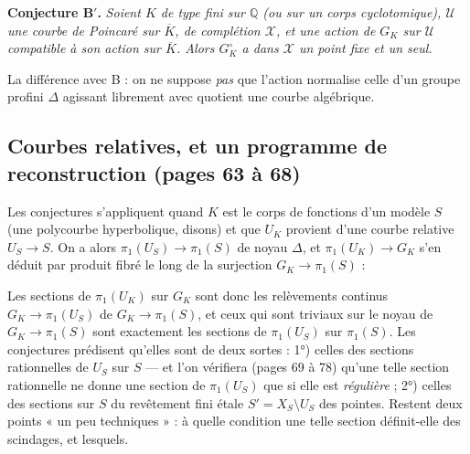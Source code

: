 \documentclass[11pt,a4paper]{article}
\begin{document}
\textbf{Conjecture B$'$.} \emph{Soient $K$ de type fini sur $\mathbb{Q}$ (ou
sur un corps cyclotomique), $\mathcal{U}$ une courbe de Poincaré sur
$\overline{K}$, de complétion $\mathcal{X}$, et une action de $G_K$ sur
$\mathcal{U}$ compatible à son action sur $\overline{K}$. Alors $G_K^{\circ}$
a dans $\mathcal{X}$ un point fixe et un seul.}

La différence avec B : on ne suppose \emph{pas} que l'action normalise celle
d'un groupe profini $\Delta$ agissant librement avec quotient une courbe
algébrique.

\subsection*{Courbes relatives, et un programme de reconstruction (pages 63 à 68)}

Les conjectures s'appliquent quand $K$ est le corps de fonctions d'un modèle
$S$ (une polycourbe hyperbolique, disons) et que $U_K$ provient d'une courbe
relative $U_S \to S$. On a alors $\pi_1(U_S) \to \pi_1(S)$ de noyau $\Delta$,
et $\pi_1(U_K) \to G_K$ s'en déduit par produit fibré le long de la
surjection $G_K \to \pi_1(S)$ :


Les sections de $\pi_1(U_K)$ sur $G_K$ sont donc les relèvements continus $G_K
\to \pi_1(U_S)$ de $G_K \to \pi_1(S)$, et ceux qui sont triviaux sur le noyau de
$G_K \to \pi_1(S)$ sont exactement les sections de $\pi_1(U_S)$ sur $\pi_1(S)$.
Les conjectures prédisent qu'elles sont de deux sortes : 1°) celles des
sections rationnelles de $U_S$ sur $S$ — et l'on vérifiera (pages 69 à 78)
qu'une telle section rationnelle ne donne une section de $\pi_1(U_S)$ que si
elle est \emph{régulière} ; 2°) celles des sections sur $S$ du revêtement fini
étale $S' = X_S \setminus U_S$ des pointes. Restent deux points « un peu
techniques » : à quelle condition une telle section définit-elle des scindages,
et lesquels.
\end{document}
